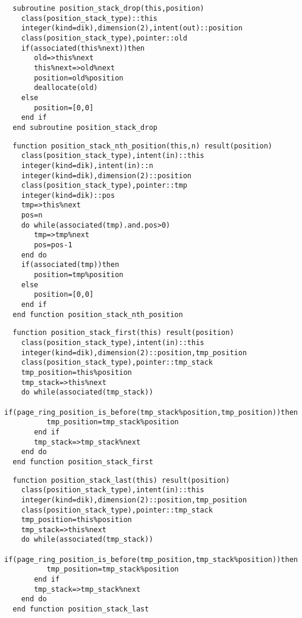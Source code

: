 \begin{Verbatim}
  subroutine position_stack_drop(this,position)
    class(position_stack_type)::this
    integer(kind=dik),dimension(2),intent(out)::position
    class(position_stack_type),pointer::old
    if(associated(this%next))then
       old=>this%next
       this%next=>old%next
       position=old%position
       deallocate(old)
    else
       position=[0,0]
    end if
  end subroutine position_stack_drop
\end{Verbatim}

\begin{Verbatim}
  function position_stack_nth_position(this,n) result(position)
    class(position_stack_type),intent(in)::this
    integer(kind=dik),intent(in)::n
    integer(kind=dik),dimension(2)::position
    class(position_stack_type),pointer::tmp
    integer(kind=dik)::pos
    tmp=>this%next
    pos=n
    do while(associated(tmp).and.pos>0)
       tmp=>tmp%next
       pos=pos-1
    end do
    if(associated(tmp))then
       position=tmp%position
    else
       position=[0,0]
    end if
  end function position_stack_nth_position
\end{Verbatim}
  
\begin{Verbatim}
  function position_stack_first(this) result(position)
    class(position_stack_type),intent(in)::this
    integer(kind=dik),dimension(2)::position,tmp_position
    class(position_stack_type),pointer::tmp_stack
    tmp_position=this%position
    tmp_stack=>this%next
    do while(associated(tmp_stack))
       if(page_ring_position_is_before(tmp_stack%position,tmp_position))then
          tmp_position=tmp_stack%position
       end if
       tmp_stack=>tmp_stack%next
    end do
  end function position_stack_first
\end{Verbatim}
  
\begin{Verbatim}
  function position_stack_last(this) result(position)
    class(position_stack_type),intent(in)::this
    integer(kind=dik),dimension(2)::position,tmp_position
    class(position_stack_type),pointer::tmp_stack
    tmp_position=this%position
    tmp_stack=>this%next
    do while(associated(tmp_stack))
       if(page_ring_position_is_before(tmp_position,tmp_stack%position))then
          tmp_position=tmp_stack%position
       end if
       tmp_stack=>tmp_stack%next
    end do
  end function position_stack_last
\end{Verbatim}
  
